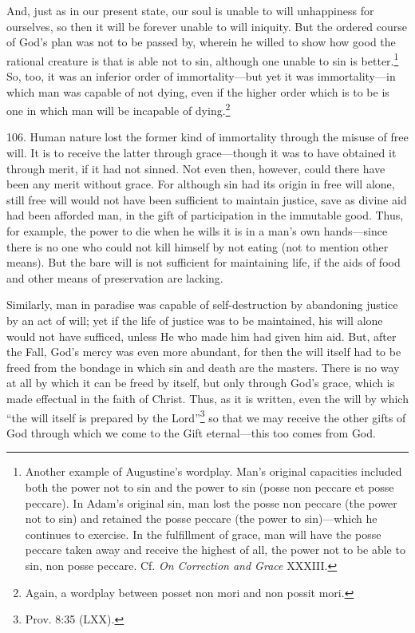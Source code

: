 And, just as in our present state, our soul is unable to will unhappiness for ourselves, so then it will be forever unable to will iniquity. But the ordered course of God's plan was not to be passed by, wherein he willed to show how good the rational creature is that is able not to sin, although one unable to sin is better.\footnote{Another example of Augustine's wordplay. Man's original capacities included both the power not to sin and the power to sin (posse non peccare et posse peccare). In Adam's original sin, man lost the posse non peccare (the power not to sin) and retained the posse peccare (the power to sin)—which he continues to exercise. In the fulfillment of grace, man will have the posse peccare taken away and receive the highest of all, the power not to be able to sin, non posse peccare. Cf. \emph{On Correction and Grace} XXXIII.} So, too, it was an inferior order of immortality—but yet it was immortality—in which man was capable of not dying, even if the higher order which is to be is one in which man will be incapable of dying.\footnote{Again, a wordplay between posset non mori and non possit mori.}

106. Human nature lost the former kind of immortality through the misuse of free will. It is to receive the latter through grace—though it was to have obtained it through merit, if it had not sinned. Not even then, however, could there have been any merit without grace. For although sin had its origin in free will alone, still free will would not have been sufficient to maintain justice, save as divine aid had been afforded man, in the gift of participation in the immutable good. Thus, for example, the power to die when he wills it is in a man's own hands—since there is no one who could not kill himself by not eating (not to mention other means). But the bare will is not sufficient for maintaining life, if the aids of food and other means of preservation are lacking.

Similarly, man in paradise was capable of self-destruction by abandoning justice by an act of will; yet if the life of justice was to be maintained, his will alone would not have sufficed, unless He who made him had given him aid. But, after the Fall, God's mercy was even more abundant, for then the will itself had to be freed from the bondage in which sin and death are the masters. There is no way at all by which it can be freed by itself, but only through God's grace, which is made effectual in the faith of Christ. Thus, as it is written, even the will by which ``the will itself is prepared by the Lord''\footnote{Prov. 8:35 (LXX).} so that we may receive the other gifts of God through which we come to the Gift eternal—this too comes from God.

